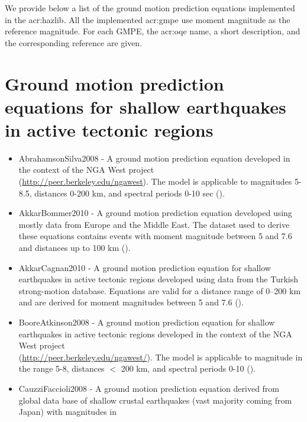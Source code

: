 \label{sec:gmpes_list}
We provide below a list of the ground motion prediction equations 
implemented in the \gls{acr:hazlib}. All the implemented \gls{acr:gmpe}
use moment magnitude as the reference magnitude. For each GMPE,
the \gls{acr:oqe} name, a short description, and the corresponding reference
are given.
%
\section{Ground motion prediction equations for shallow earthquakes 
    in active tectonic regions}
\begin{itemize} 
    \item AbrahamsonSilva2008 - A ground motion prediction equation 
        developed in the context of the NGA West project \hfill \\    (\href{http://peer.berkeley.edu/ngawest/}{http://peer.berkeley.edu/ngawest}).
        The model is applicable to magnitudes 5-8.5, distances 0-200 km, and
        spectral periods 0-10 sec (\cite{abrahamson2008}).
    \item AkkarBommer2010 - A ground motion prediction equation 
        developed using mostly data from Europe and the Middle East. The dataset 
        used to derive these equations contains events with moment 
        magnitude between 5 and 7.6 and distances up to 100 km (\cite{akkar2010}).
    \item AkkarCagnan2010 - A ground motion prediction equation for shallow
        earthquakes in active tectonic regions developed using data from the 
        Turkish strong-motion database. Equations are valid for a distance 
        range of 0–200 km and are derived for moment magnitudes 
        between 5 and 7.6 (\cite{akkar2010a}).
    \item BooreAtkinson2008 - A ground motion prediction equation 
        for shallow earthquakes in active tectonic regions developed in 
        the context of the NGA West project \hfill \\
        (\href{http://peer.berkeley.edu/ngawest/}
        {http://peer.berkeley.edu/ngawest/}).
        The model is applicable to magnitude in the range 5-8, distances $<$ 200 km,
        and spectral periods 0-10 (\cite{boore2008}).
    \item CauzziFaccioli2008 - A ground motion prediction equation 
        derived from global data base of shallow crustal earthquakes (vast majority coming from Japan) with magnitudes in

\end{itemize}
